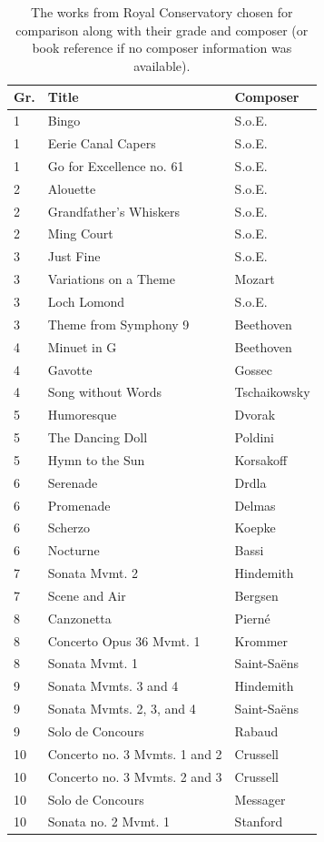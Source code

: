 \documentclass[12pt]{report}
\begin{document}
\begin{table}[ht!]
	\centering
	\caption{The works from Royal Conservatory chosen for comparison along with their grade and composer (or book reference if no composer information was available).}
    \begin{tabular}{| l | l | l |}
        \hline
    Gr. & Title & Composer \\ \hline
    1 & Bingo & S.o.E. \\ \hline
	1 & Eerie Canal Capers & S.o.E. \\ \hline
	1 & Go for Excellence no. 61 & S.o.E. \\ \hline
	2 & Alouette & S.o.E. \\ \hline
	2 & Grandfather's Whiskers & S.o.E. \\ \hline
	2 & Ming Court & S.o.E. \\ \hline
	3 & Just Fine & S.o.E. \\ \hline
	3 & Variations on a Theme & Mozart \\ \hline
	3 & Loch Lomond & S.o.E. \\ \hline
	3 & Theme from Symphony 9 & Beethoven \\ \hline
	4 & Minuet in G & Beethoven \\ \hline
	4 & Gavotte & Gossec \\ \hline
	4 & Song without Words & Tschaikowsky \\ \hline
	5 & Humoresque & Dvorak \\ \hline
	5 & The Dancing Doll & Poldini \\ \hline
	5 & Hymn to the Sun & Korsakoff \\ \hline
	6 & Serenade & Drdla \\ \hline
	6 & Promenade & Delmas \\ \hline
	6 & Scherzo & Koepke \\ \hline
	6 & Nocturne & Bassi \\ \hline
	7 & Sonata Mvmt. 2 & Hindemith \\ \hline
	7 & Scene and Air & Bergsen \\ \hline
	8 & Canzonetta & Piern\'e \\ \hline
	8 & Concerto Opus 36 Mvmt. 1 & Krommer \\ \hline
	8 & Sonata Mvmt. 1 & Saint-Sa\"ens \\ \hline
	9 & Sonata Mvmts. 3 and 4 & Hindemith \\ \hline
	9 & Sonata Mvmts. 2, 3, and 4 & Saint-Sa\"ens \\ \hline
	9 & Solo de Concours & Rabaud \\ \hline
	10 & Concerto no. 3 Mvmts. 1 and 2 & Crussell \\ \hline
	10 & Concerto no. 3 Mvmts. 2 and 3 & Crussell \\ \hline
	10 & Solo de Concours & Messager \\ \hline
	10 & Sonata no. 2 Mvmt. 1 & Stanford \\
        \hline
    \end{tabular}
	\label{table:pieces}
\end{table} 
\end{document}
